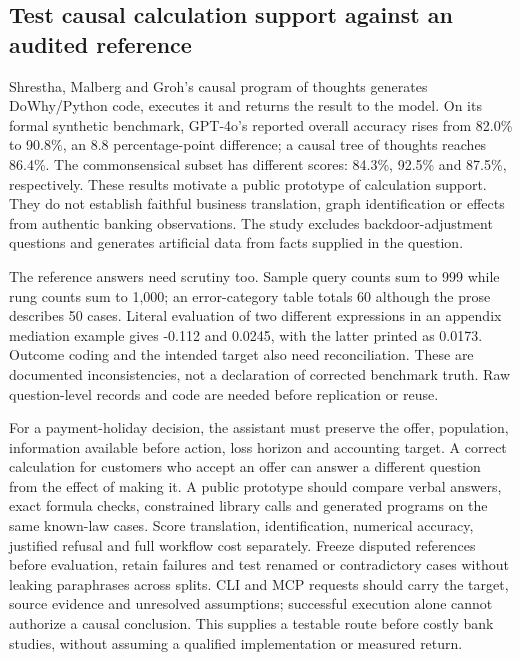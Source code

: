 \hypertarget{test-causal-calculation-support-against-an-audited-reference}{%
\subsection{Test causal calculation support against an audited
reference}\label{test-causal-calculation-support-against-an-audited-reference}}

Shrestha, Malberg and Groh's causal program of thoughts generates
DoWhy/Python code, executes it and returns the result to the model. On
its formal synthetic benchmark, GPT-4o's reported overall accuracy rises
from 82.0\% to 90.8\%, an 8.8 percentage-point difference; a causal tree
of thoughts reaches 86.4\%. The commonsensical subset has different
scores: 84.3\%, 92.5\% and 87.5\%, respectively. These results motivate
a public prototype of calculation support. They do not establish
faithful business translation, graph identification or effects from
authentic banking observations. The study excludes backdoor-adjustment
questions and generates artificial data from facts supplied in the
question.\citep{exec21_prophets,exec21_prophets_reference}

The reference answers need scrutiny too. Sample query counts sum to 999
while rung counts sum to 1,000; an error-category table totals 60
although the prose describes 50 cases. Literal evaluation of two
different expressions in an appendix mediation example gives -0.112 and
0.0245, with the latter printed as 0.0173. Outcome coding and the
intended target also need reconciliation. These are documented
inconsistencies, not a declaration of corrected benchmark truth. Raw
question-level records and code are needed before replication or
reuse.\citep{exec21_prophets,exec21_prophets_reference}

For a payment-holiday decision, the assistant must preserve the offer,
population, information available before action, loss horizon and
accounting target. A correct calculation for customers who accept an
offer can answer a different question from the effect of making it. A
public prototype should compare verbal answers, exact formula checks,
constrained library calls and generated programs on the same known-law
cases. Score translation, identification, numerical accuracy, justified
refusal and full workflow cost separately. Freeze disputed references
before evaluation, retain failures and test renamed or contradictory
cases without leaking paraphrases across splits. CLI and MCP requests
should carry the target, source evidence and unresolved assumptions;
successful execution alone cannot authorize a causal conclusion. This
supplies a testable route before costly bank studies, without assuming a
qualified implementation or measured return.


